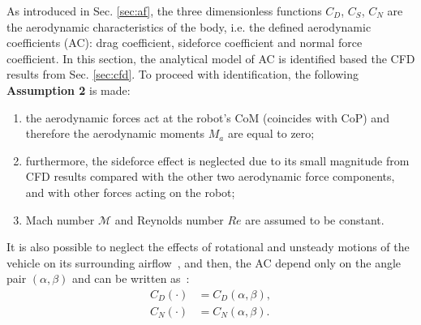 As introduced in Sec. \ref{sec:af}, the three dimensionless functions $C_D$, $C_S$, $C_N$ are the aerodynamic characteristics of the body, i.e. the defined aerodynamic coefficients (AC): drag coefficient, sideforce coefficient and normal force coefficient. In this section, the analytical model of AC is identified based the CFD results from Sec. \ref{sec:cfd}. To proceed with identification, the following \textbf{Assumption 2} is made:
\begin{enumerate}
\item the aerodynamic forces act at the robot's CoM (coincides with CoP) and therefore the aerodynamic moments ${M}_a$ are equal to zero;

\item furthermore, the sideforce effect is neglected due to its small magnitude from CFD results compared with the other two aerodynamic force components, and with other forces acting on the robot;
\item Mach number $\mathcal{M}$ and Reynolds number $Re$ are assumed to be constant.
\end{enumerate}
It is also possible to neglect the effects of rotational and unsteady motions of the vehicle on its surrounding airflow~\cite{c5}, and then, the AC depend only on the angle pair $(\alpha,\beta)$ and can be written as~\cite{c3}:
\begin{align*}
    C_D(\cdot)& =C_D(\alpha, \beta) , \\
      C_N(\cdot)& =C_N(\alpha, \beta) .
\end{align*}
